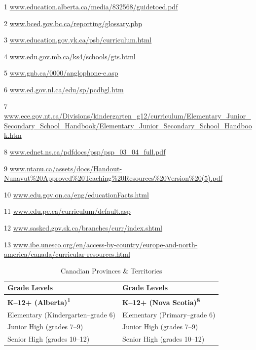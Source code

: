 \documentclass[
]{book}
\theoremstyle{definition}
\theoremstyle{definition}
\theoremstyle{definition}
\theoremstyle{definition}
\theoremstyle{remark}
\begin{document}
\newpage

\begin{ThreePartTable}
\begin{TableNotes}
\item[1] \url{www.education.alberta.ca/media/832568/guidetoed.pdf}
\item[2] \url{www.bced.gov.bc.ca/reporting/glossary.php}
\item[3] \url{www.education.gov.yk.ca/psb/curriculum.html}
\item[4] \url{www.edu.gov.mb.ca/ks4/schools/gts.html}
\item[5] \url{www.gnb.ca/0000/anglophone-e.asp}
\item[6] \url{www.ed.gov.nl.ca/edu/sp/pcdbgl.htm}
\item[7] \url{www.ece.gov.nt.ca/Divisions/kindergarten_g12/curriculum/Elementary_Junior_Secondary_School_Handbook/Elementary_Junior_Secondary_School_Handbook.htm}
\item[8] \url{www.ednet.ns.ca/pdfdocs/psp/psp_03_04_full.pdf}
\item[9] \url{www.ntanu.ca/assets/docs/Handout-Nunavut\%20Approved\%20Teaching\%20Resources\%20Version\%20(5).pdf}
\item[10] \url{www.edu.gov.on.ca/eng/educationFacts.html}
\item[11] \url{www.edu.pe.ca/curriculum/default.asp}
\item[12] \url{www.sasked.gov.sk.ca/branches/curr/index.shtml}
\item[13] \url{www.ibe.unesco.org/en/access-by-country/europe-and-north-america/canada/curricular-resources.html}
\end{TableNotes}
\begin{longtable}[t]{>{}l|l}
\caption{\label{tab:unnamed-chunk-128}Canadian Provinces \& Territories}\\
\toprule
Grade Levels & Grade Levels \\
\midrule
\textbf{K–12+ (Alberta)\textsuperscript{1}} & \textbf{K–12+ (Nova Scotia)\textsuperscript{8}}\\
\hspace{1em}Elementary (Kindergarten–grade 6) & \hspace{1em}Elementary (Primary–grade 6)\\
\hspace{1em}Junior High (grades 7–9) & \hspace{1em}Junior High (grades 7–9)\\
\hspace{1em}Senior High (grades 10–12) & \hspace{1em}Senior High (grades 10–12)\\

\end{longtable}
\end{ThreePartTable}
\end{document}
